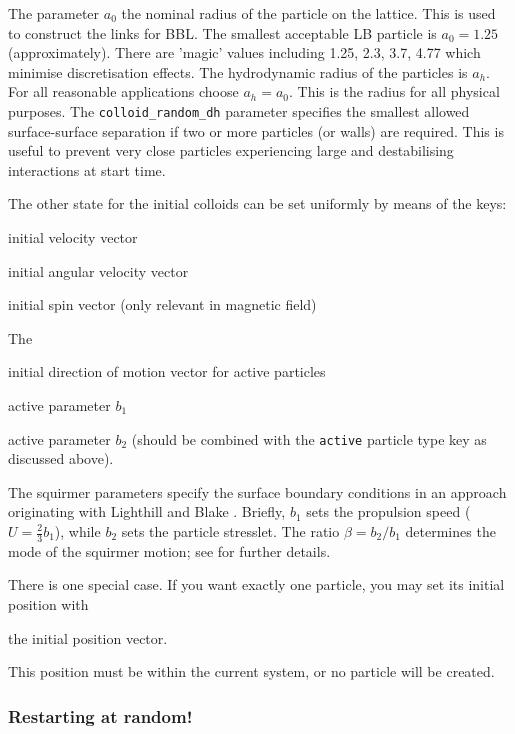 

The parameter $a_0$ the nominal radius of the particle on the lattice.
This is used to construct the links for BBL. The smallest acceptable LB
particle is $a_0 = 1.25$ (approximately). There are 'magic' values
including 1.25, 2.3, 3.7, 4.77 which minimise discretisation effects.
The hydrodynamic radius of the particles is $a_h$. For all
reasonable applications choose $a_h = a_0$. This is the radius for
all physical purposes. The \texttt{colloid\_random\_dh} parameter
specifies the smallest allowed surface-surface separation if two or
more particles (or walls) are required. This is useful to prevent
very close particles experiencing large and destabilising interactions
at start time.

The other state for the initial colloids can be set uniformly by
means of the keys:

 initial velocity vector

 initial angular velocity vector

 initial spin vector (only relevant in magnetic
field)

The 

 initial direction of motion vector for active
particles

 active parameter $b_1$

 active parameter $b_2$ (should be combined
with the \texttt{active} particle type key as discussed above).

The squirmer parameters specify the surface boundary conditions in
an approach originating with Lighthill \cite{lighthill} and Blake
\cite{blake}. Briefly, $b_1$ sets the propulsion speed
($U = {\frac{2}{3}} b_1$), while $b_2$ sets the
particle stresslet. The ratio $\beta = b_2/b_1$ determines the
mode of the squirmer motion; see \cite{isaac} for further details.


There is one special case. If you want exactly one particle, you may
set its initial position with

 the initial position vector.

This position must be within the current system, or no particle will
be created.

\subsubsection{Restarting at random!}

